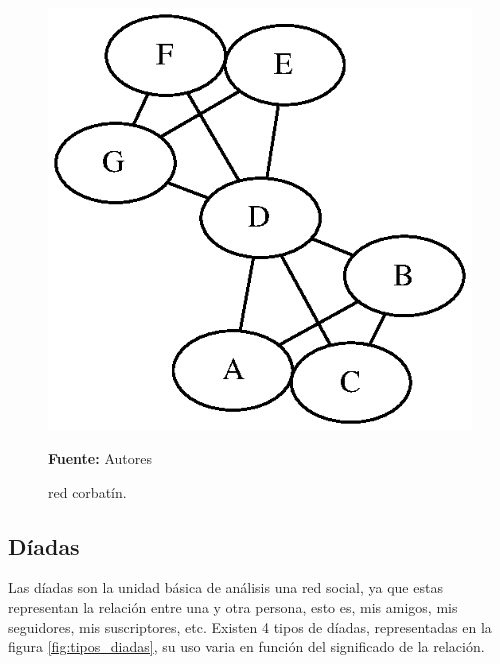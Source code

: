 \begin{figure}[!htb]
  \begin{center}
    \includegraphics{./imagenes/bow_tie.eps}
    \caption{red corbatín.}
    \label{fig:bow_tie}
    \textbf{Fuente:}  Autores
  \end{center}
\end{figure}

\subsection{Díadas}

Las díadas son la unidad básica de análisis una red social, ya que estas representan la relación entre una y otra persona, esto es, mis amigos, mis seguidores, mis suscriptores, etc. Existen 4 tipos de díadas, representadas en la figura \ref{fig:tipos_diadas}, su uso varia en función del significado de la relación.

